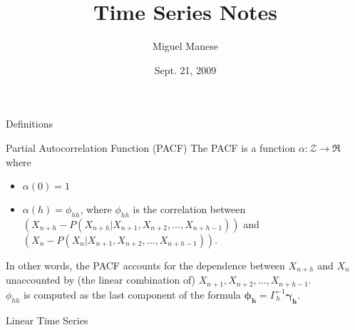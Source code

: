 \documentclass{article}
\title{Time Series Notes}
\author{Miguel Manese}
\date{Sept. 21, 2009}
\begin{document}
\maketitle

\begin{section}{Definitions}

\begin{subsection}{Partial Autocorrelation Function (PACF)}
The PACF is a function $\alpha : \mathcal{Z} \rightarrow \Re$ where

\begin{itemize}
\item $\alpha(0) = 1$
\item $\alpha(h) = \phi_{hh}$, where $\phi_{hh}$ is the correlation between
$(X_{n+h} - P(X_{n+h} | X_{n+1}, X_{n+2}, \ldots, X_{n+h-1}))$ and
$(X_{n} - P(X_{n} | X_{n+1}, X_{n+2}, \ldots, X_{n+h-1}))$. 
\end{itemize} 

\noindent In other words, the PACF accounts for the dependence between 
$X_{n+h}$ and 
$X_{n}$ unaccounted by (the linear combination of) $X_{n+1}, X_{n+2}, \ldots,
X_{n+h-1}$.\\

$\phi_{hh}$ is computed as the last component of the formula
$\mathbf{\phi_{h}} = \Gamma_{h}^{-1} \mathbf{\gamma_{h}}$. 
\end{subsection}
\end{section}


\begin{section}{Linear Time Series}
\end{section}
\end{document}

